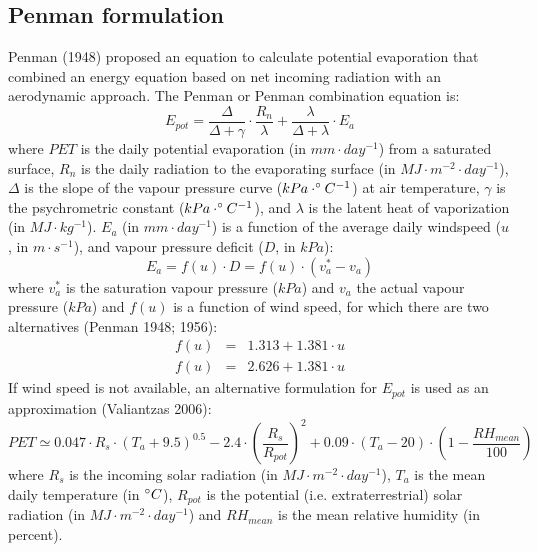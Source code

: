 \documentclass[11pt,a4paper]{article}
\begin{document}
\subsection{Penman formulation}
Penman (1948) proposed an equation to calculate potential evaporation that combined an energy equation based on net incoming radiation with an aerodynamic approach. The Penman or Penman combination equation is:
\begin{equation}
E_{pot} = \frac{\Delta}{\Delta+\gamma}\cdot \frac{R_n}{\lambda}+\frac{\lambda}{\Delta + \lambda}\cdot E_a
\end{equation}
where $PET$ is the daily potential evaporation (in $mm \cdot day^{-1}$) from a saturated surface, $R_{n}$ is the daily radiation to the evaporating surface (in $MJ\cdot m^{-2}\cdot day^{-1}$), $\Delta$ is the slope of the vapour pressure curve ($kPa\cdot \degree C^{-1}$) at air temperature, $\gamma$ is the psychrometric constant ($kPa\cdot \degree C^{-1}$), and $\lambda$ is the latent heat of vaporization (in $MJ\cdot kg^{-1}$). $E_a$  (in $mm \cdot day^{-1}$) is a function of the average daily windspeed ($u$, in $m\cdot s^{-1}$), and vapour pressure deficit ($D$, in $kPa$):
\begin{equation}
E_a = f(u) \cdot D = f(u) \cdot (v_a^*-v_a)
\end{equation}
where $v_a^*$ is the saturation vapour pressure ($kPa$) and $v_a$ the actual vapour pressure ($kPa$) and $f(u)$ is a function of wind speed, for which there are two alternatives (Penman 1948; 1956):
\begin{eqnarray}
f(u) &=& 1.313 + 1.381 \cdot u\\
f(u) &=& 2.626 + 1.381 \cdot u
\end{eqnarray}
If wind speed is not available, an alternative formulation for $E_{pot}$ is used as an approximation (Valiantzas 2006):
\begin{equation}
PET \simeq 0.047\cdot R_s \cdot (T_a+9.5)^{0.5}-2.4\cdot (\frac{R_s}{R_{pot}})^2+0.09\cdot(T_a-20)\cdot(1-\frac{RH_{mean}}{100})
\end{equation}
where $R_s$ is the incoming solar radiation (in $MJ\cdot m^{-2}\cdot day^{-1}$), $T_a$ is the mean daily temperature (in $\degree C$), $R_{pot}$ is the potential (i.e. extraterrestrial) solar radiation (in $MJ\cdot m^{-2}\cdot day^{-1}$) and $RH_{mean}$ is the mean relative humidity (in percent). 
\end{document}
